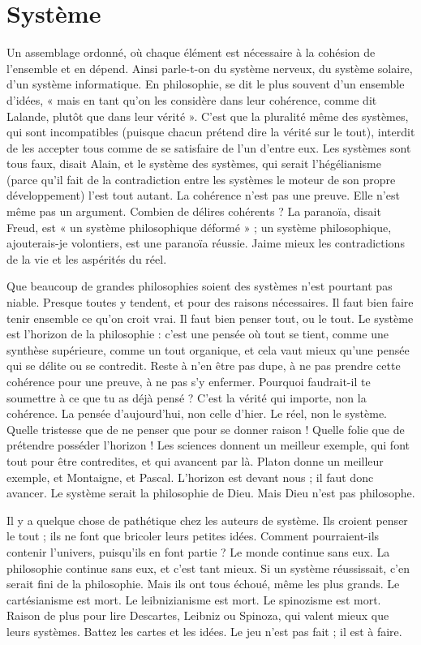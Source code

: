 \section{Système}
Un assemblage ordonné, où chaque élément est nécessaire à la
cohésion de l’ensemble et en dépend. Ainsi parle-t-on du système
nerveux, du système solaire, d’un système informatique. En philosophie, se
dit le plus souvent d’un ensemble d’idées, « mais en tant qu’on les considère
dans leur cohérence, comme dit Lalande, plutôt que dans leur vérité ». C’est
que la pluralité même des systèmes, qui sont incompatibles (puisque chacun
prétend dire la vérité sur le tout), interdit de les accepter tous comme de se
satisfaire de l’un d’entre eux. Les systèmes sont tous faux, disait Alain, et le système
des systèmes, qui serait l’hégélianisme (parce qu’il fait de la contradiction
entre les systèmes le moteur de son propre développement) l’est tout autant. La
cohérence n’est pas une preuve. Elle n’est même pas un argument. Combien de
délires cohérents ? La paranoïa, disait Freud, est « un système philosophique
déformé » ; un système philosophique, ajouterais-je volontiers, est une paranoïa
réussie. Jaime mieux les contradictions de la vie et les aspérités du réel.

Que beaucoup de grandes philosophies soient des systèmes n’est pourtant
pas niable. Presque toutes y tendent, et pour des raisons nécessaires. Il faut bien
faire tenir ensemble ce qu’on croit vrai. Il faut bien penser tout, ou le tout. Le
système est l'horizon de la philosophie : c’est une pensée où tout se tient,
comme une synthèse supérieure, comme un tout organique, et cela vaut mieux
qu'une pensée qui se délite ou se contredit. Reste à n’en être pas dupe, à ne pas
prendre cette cohérence pour une preuve, à ne pas s’y enfermer. Pourquoi faudrait-il
te soumettre à ce que tu as déjà pensé ? C’est la vérité qui importe, non
la cohérence. La pensée d’aujourd’hui, non celle d’hier. Le réel, non le système.
Quelle tristesse que de ne penser que pour se donner raison ! Quelle folie que
de prétendre posséder l’horizon ! Les sciences donnent un meilleur exemple,
qui font tout pour être contredites, et qui avancent par là. Platon donne un
meilleur exemple, et Montaigne, et Pascal. L’horizon est devant nous ; il faut
donc avancer. Le système serait la philosophie de Dieu. Mais Dieu n’est pas
philosophe.

Il y a quelque chose de pathétique chez les auteurs de système. Ils croient
penser le tout ; ils ne font que bricoler leurs petites idées. Comment pourraient-ils
contenir l’univers, puisqu'ils en font partie ? Le monde continue sans
eux. La philosophie continue sans eux, et c’est tant mieux. Si un système réussissait,
c’en serait fini de la philosophie. Mais ils ont tous échoué, même les plus
grands. Le cartésianisme est mort. Le leibnizianisme est mort. Le spinozisme est
mort. Raison de plus pour lire Descartes, Leibniz ou Spinoza, qui valent mieux
que leurs systèmes. Battez les cartes et les idées. Le jeu n’est pas fait ; il est à
faire.

